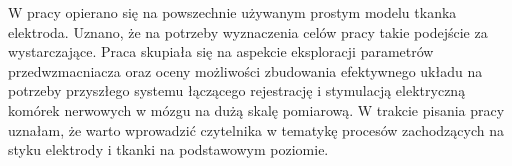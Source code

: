 \begin{frame}[t]

    \begin{block}{\tb}
    \end{block}
W pracy opierano się na powszechnie używanym prostym modelu tkanka elektroda. Uznano, że na potrzeby wyznaczenia celów pracy takie podejście za wystarczające. 
Praca skupiała się na aspekcie eksploracji parametrów przedwzmacniacza oraz oceny możliwości zbudowania efektywnego układu na potrzeby przyszłego systemu łączącego rejestrację i stymulacją elektryczną komórek nerwowych w mózgu na dużą skalę pomiarową.
W trakcie pisania pracy uznałam, że warto wprowadzić czytelnika w tematykę procesów zachodzących na styku elektrody i tkanki na podstawowym poziomie. 

\end{frame}

